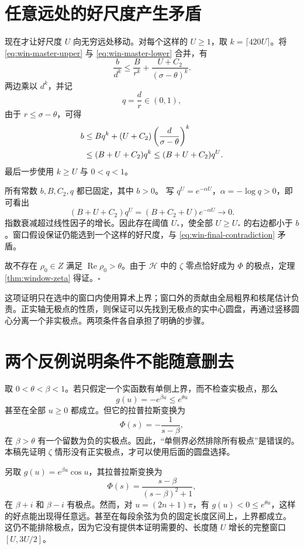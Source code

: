 \documentclass[UTF8,fontset=fandol,a4paper,openany,oneside]{ctexbook}
\theoremstyle{definition}
\theoremstyle{remark}
\begin{document}
\section{任意远处的好尺度产生矛盾}

现在才让好尺度 $U$ 向无穷远处移动。对每个这样的 $U\ge1$，取
$k=\lceil420U\rceil$。将
\eqref{eq:win-master-upper} 与
\eqref{eq:win-master-lower} 合并，有
\[
 \frac b{d^k}
 \le\frac B{r^k}+\frac{U+C_2}{(\sigma-\theta)^k}.
\]
两边乘以 $d^k$，并记
\[
 q=\frac dr\in(0,1),
\]
由于 $r\le\sigma-\theta$，可得
\begin{align}
 b
 &\le Bq^k+(U+C_2)
          \left(\frac d{\sigma-\theta}\right)^k\notag\\
 &\le(B+U+C_2)q^k
 \le(B+U+C_2)q^U.
 \label{eq:win-final-contradiction}
\end{align}
最后一步使用 $k\ge U$ 与 $0<q<1$。

所有常数 $b,B,C_2,q$ 都已固定，其中 $b>0$。
写 $q^U=e^{-\alpha U}$，$\alpha=-\log q>0$，即可看出
\[
 (B+U+C_2)q^U
       =(B+C_2+U)e^{-\alpha U}\longrightarrow0.
\]
指数衰减超过线性因子的增长。因此存在阈值 $U_*$，使全部 $U\ge U_*$ 的右边都小于 $b$。窗口假设保证仍能选到一个这样的好尺度，与
\eqref{eq:win-final-contradiction} 矛盾。

故不存在 $\rho_0\in Z$ 满足
$\operatorname{Re}\rho_0>\theta$。由于 $\mathcal H$ 中的 $\zeta$ 零点恰好成为 $\Phi$ 的极点，定理
\ref{thm:window-zeta} 得证。\hfill$\square$

这项证明只在选中的窗口内使用算术上界；窗口外的贡献由全局粗界和核尾估计负责。正实轴无极点的性质，则保证可以先找到无极点的实中心圆盘，再通过竖移圆心分离一个非实极点。两项条件各自承担了明确的步骤。

\section{两个反例说明条件不能随意删去}
取 $0<\theta<\beta<1$。若只假定一个实函数有单侧上界，而不检查实极点，那么
\[
g(u)=-e^{\beta u}\le e^{\theta u}
\]
甚至在全部 $u\ge0$ 都成立。但它的拉普拉斯变换为
\[
\Phi(s)=-\frac1{s-\beta},
\]
在 $\beta>\theta$ 有一个留数为负的实极点。因此，“单侧界必然排除所有极点”是错误的。本稿先证明 $\zeta$ 情形没有正实极点，才可以使用后面的圆盘选择。

另取 $g(u)=e^{\beta u}\cos u$，其拉普拉斯变换为
\[
\Phi(s)=\frac{s-\beta}{(s-\beta)^2+1},
\]
在 $\beta+i$ 和 $\beta-i$ 有极点。然而，对
$u=(2n+1)\pi$，有 $g(u)<0\le e^{\theta u}$，这样的好点能出现得任意远。甚至在每段余弦为负的固定长度区间上，上界都成立。
这仍不能排除极点，因为它没有提供本证明需要的、长度随 $U$ 增长的完整窗口 $[U,3U/2]$。
\end{document}
